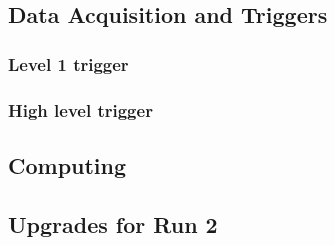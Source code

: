 \subsection{Data Acquisition and Triggers}

\subsubsection{Level 1 trigger}

\subsubsection{High level trigger}

\subsection{Computing}

\subsection{Upgrades for Run 2}

